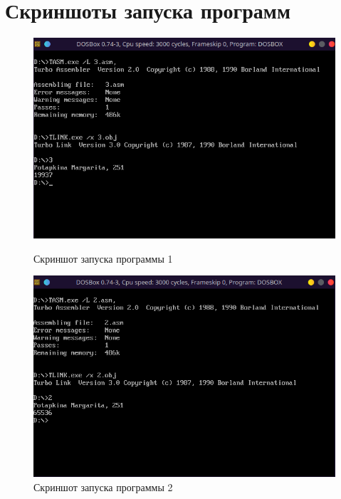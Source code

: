 \documentclass[bachelor, och, otchet]{../SCWorks}
\begin{document}
\section{Скриншоты запуска программ}
\begin{figure}[H]
\centering
\includegraphics[scale=0.9]{1.png}
\caption {Скриншот запуска программы 1}
\includegraphics[scale=0.9]{2.png}
\caption {Скриншот запуска программы 2}
\end{figure}
\end{document}
